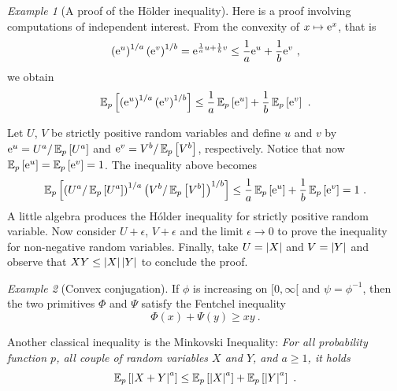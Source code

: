 \documentclass[12pt,a4paper]{amsart}
\theoremstyle{plain}%
\theoremstyle{definition}
\theoremstyle{remark}
\newtheorem{example}{Example}
\begin{document}
\begin{example}[A proof of the H\"older inequality]
  Here is a proof involving computations of independent interest. From the convexity of $x \mapsto \mathrm{e}^x$, that is
\begin{equation*}
  \left(\mathrm{e}^u\right)^{1/a} \left(\mathrm{e}^v\right)^{1/b} = \mathrm{e}^{\frac1a u + \frac1b v} \leq \frac1a \mathrm{e}^u + \frac1b \mathrm{e}^v \ , 
\end{equation*}
we obtain
\begin{equation*}
  \operatorname{\mathbb E}_{p}\left[\left(\mathrm{e}^u\right)^{1/a} \left(\mathrm{e}^v\right)^{1/b}\right] \leq \frac1a \operatorname{\mathbb E}_{p}\left[\mathrm{e}^u\right] + \frac1b \operatorname{\mathbb E}_{p}\left[\mathrm{e}^v\right] \ .
\end{equation*}

Let $U$, $V$ be strictly positive random variables and define $u$ and $v$ by $\mathrm{e}^u = U^a / \operatorname{\mathbb E}_{p}\left[U^a\right]$ and $\mathrm{e}^v = V^b / \operatorname{\mathbb E}_{p}\left[V^b\right]$, respectively. Notice that now $\operatorname{\mathbb E}_{p}\left[\mathrm{e}^u\right] = \operatorname{\mathbb E}_{p}\left[\mathrm{e}^v\right] = 1$. The inequality above becomes
\begin{equation*}
  \expectat p {\left(U^a / \expectat p {U^a}\right)^{1/a} \left(V^b / \expectat p {V^b}\right)^{1/b}} \leq \frac1a \expectat p {\euler^u} + \frac1b \expectat p {\euler^v} = 1\ .
\end{equation*}
A little algebra produces the H\'older inequality for strictly positive random variable. Now consider $U + \epsilon$, $V+\epsilon$ and the limit $\epsilon\to0$ to prove the inequality for non-negative random variables. Finally, take $U = \left\vert X\right\vert$ and $V = \left\vert Y\right\vert$ and observe that $XY \leq \left\vert X\right\vert \left\vert Y\right\vert$ to conclude the proof.
\end{example}

\begin{example}[Convex conjugation]
If $\phi$ is increasing on $[0,\infty[$ and $\psi=\phi^{-1}$, then the two primitives $\Phi$ and $\Psi$ satisfy the Fentchel inequality
\begin{equation*}
    \Phi(x) + \Psi(y) \geq xy \ .
\end{equation*}
\end{example}

Another classical inequality is the Minkovski Inequality: \emph{For all probability function $p$, all couple of random variables $X$ and $Y$, and $a \geq 1$, it holds}
\begin{equation*}
  \expectat p {\aval{X+Y}^a} \leq \expectat p {\aval{X}^a} + \expectat p {\aval{Y}^a} \ . 
\end{equation*}
\end{document}
